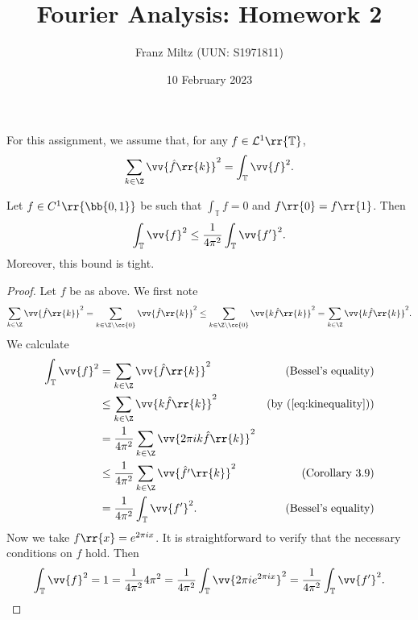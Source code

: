 \documentclass{article}
\begin{document}
\title{Fourier Analysis: Homework 2}
\author{Franz Miltz (UUN: S1971811)}
\date{10 February 2023}
\maketitle

For this assignment, we assume that, for any $f\in\mathcal L^1\rr{\mathbb T}$,
\begin{equation}\label{eq:bessels_equality}
  \sum_{k\in\Z}\vv{\hat f\rr{k}}^2 = \int_{\mathbb T}\vv{f}^2.
\end{equation}

\begin{claim*}[2a]
  Let $f\in C^1\rr{\bb{0,1}}$ be such that $\int_{\mathbb T} f = 0$ and $f\rr{0}=f\rr{1}$.
  Then
  \begin{align}\label{eq:inequality}
    \int_{\mathbb T} \vv{f}^2 \leq \frac{1}{4\pi^2}\int_{\mathbb T} \vv{f'}^2.
  \end{align}
  Moreover, this bound is tight.
  \begin{proof}
    Let $f$ be as above. We first note
    \begin{equation}\label{eq:kinequality}
      \sum_{k\in\Z} \vv{\hat f\rr{k}}^2
      = \sum_{k\in\Z\setminus\cc{0}} \vv{\hat f\rr{k}}^2
      \leq \sum_{k\in\Z\setminus\cc{0}} \vv{k\hat f\rr{k}}^2
      = \sum_{k\in\Z} \vv{k\hat f\rr{k}}^2.
    \end{equation}
    We calculate
    \begin{align*}
      \int_{\mathbb T} \vv{f}^2
      &= \sum_{k\in\Z}\vv{\hat f\rr{k}}^2 &\text{(Bessel's equality)}\\
      &\leq \sum_{k\in\Z} \vv{k\hat f\rr{k}}^2 &\text{(by~(\ref{eq:kinequality}))}\\
      &= \frac{1}{4\pi^2} \sum_{k\in\Z} \vv{2\pi ik\hat f\rr{k}}^2 \\
      &\leq \frac{1}{4\pi^2}\sum_{k\in\Z}\vv{\hat{f'}\rr{k}}^2 &\text{(Corollary 3.9)}\\
      &= \frac{1}{4\pi^2}\int_{\mathbb T} \vv{f'}^2. &\text{(Bessel's equality)}
    \end{align*}
    Now we take $f\rr{x}=e^{2\pi ix}$. It is straightforward to verify that the
    necessary conditions on $f$ hold. Then
    \begin{align*}
      \int_{\mathbb T}\vv{f}^2
      = 1
      = \frac{1}{4\pi^2}4\pi^2
      = \frac{1}{4\pi^2}\int_{\mathbb T}\vv{2\pi ie^{2\pi ix}}^2
      = \frac{1}{4\pi^2}\int_{\mathbb T}\vv{f'}^2.
    \end{align*}
  \end{proof}
\end{claim*}
\end{document}
